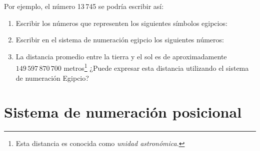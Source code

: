 \documentclass[12pt]{article}
\begin{document}
Por ejemplo, el número 13\,745 se podría escribir así:


\begin{enumerate}

    \item Escribir los números que representen los siguientes símbolos
        egipcios:


    \item Escribir en el sistema de numeración egipcio los siguientes números:


    \item La distancia promedio entre la tierra y el sol es de aproximadamente
        $149\,597\,870\,700$ metros\footnote{Esta distancia es conocida como
        \emph{unidad astronómica}.} ¿Puede expresar esta distancia utilizando
        el sistema de numeración Egipcio?

\end{enumerate}

\section{Sistema de numeración posicional}
\end{document}
